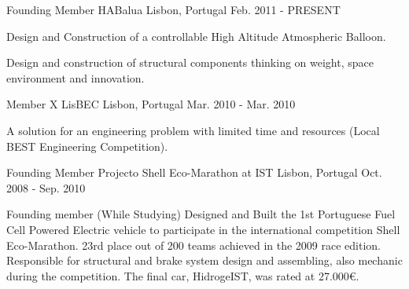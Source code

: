 \begin{cventries}
  \cventry
    {Founding Member}
    {HABalua}
    {Lisbon, Portugal}
    {Feb. 2011 - PRESENT}
    {
      \begin{cvitems}
        \item {Design and Construction of a controllable High Altitude Atmospheric Balloon.}
        \item {Design and construction of structural components thinking on weight, space environment and innovation.}
      \end{cvitems}
    }
  \cventry
    {Member}
    {X LisBEC}
    {Lisbon, Portugal}
    {Mar. 2010 - Mar. 2010}
    {
      \begin{cvitems}
        \item {A solution for an engineering problem with limited time and resources (Local BEST Engineering Competition).
}
      \end{cvitems}
    }
  \cventry
    {Founding Member}
    {Projecto Shell Eco-Marathon at IST}
    {Lisbon, Portugal}
    {Oct. 2008 - Sep. 2010}
    {
      \begin{cvitems}
        \item {Founding member (While Studying) Designed and Built the 1st Portuguese Fuel Cell Powered Electric vehicle to participate in the international competition Shell Eco-Marathon. 23rd place out of 200 teams achieved in the 2009 race edition. 
Responsible for structural and brake system design and assembling, also mechanic during the competition. The final car, HidrogeIST, was rated at 27.000€.
}
      \end{cvitems}
    }
\end{cventries}
